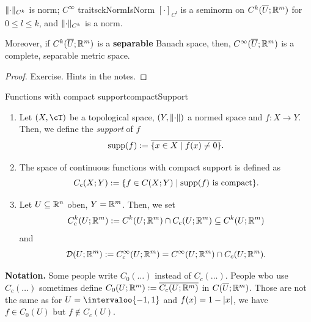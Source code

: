 \documentclass[language=english]{../../Template/TemplateLecture}
\begin{document}
\begin{thm}{$\lVert\cdot\rVert_{C^k}$ is norm; $C^\infty$ traits}{ckNormIsNorm}
    $[\cdot]_{C^l}$ is a seminorm on $C^k(\overline{U};\mathbb{R}^m)$ for $0 \leq l \leq k$, and $\lVert\cdot\rVert_{C^k}$ is a norm.

    Moreover, if $C^k(\overline{U};\mathbb{R}^m)$ is a \textbf{separable} Banach space, then, $C^\infty(\overline{U};\mathbb{R}^m)$ is a complete, separable metric space.
\end{thm}
\begin{proof}
    Exercise. Hints in the notes.
\end{proof}

\begin{defi}{Functions with compact support}{compactSupport}
    \begin{enumerate}[$(i)$]
        \item Let $(X,\cT)$ be a topological space, $(Y,\lVert\cdot\rVert)$ a normed space and $f: X \to Y$. Then, we define the \emph{support} of $f$
        \begin{equation}
            \operatorname{supp}(f) := \overline{\{x \in X \mid f(x) \neq 0\}}.
        \end{equation}
        \item The space of continuous functions with compact support is defined as 
        \begin{equation}
            C_c(X; Y) := \{f \in C(X; Y) \mid \operatorname{supp}(f) \text{ is compact}\}.
        \end{equation}
        \item Let $U \subseteq \mathbb{R}^n$ oben, $Y = \mathbb{R}^m$. Then, we set 
        \begin{equation}
            C_c^k(U; \mathbb{R}^m) := C^k(U; \mathbb{R}^m) \cap C_c(U; \mathbb{R}^m) \subseteq C^k(U; \mathbb{R}^m)
        \end{equation}
        and
        \begin{equation}
            \mathcal{D}(U; \mathbb{R}^m) := C_c^\infty(U; \mathbb{R}^m) = C^\infty(U; \mathbb{R}^m) \cap C_c(U; \mathbb{R}^m).
        \end{equation}
    \end{enumerate}
\end{defi}

\textbf{Notation.} Some people write $C_0(\ldots)$ instead of $C_c(\ldots)$. People wbo use $C_c(\ldots)$ sometimes define $C_0(U;\mathbb{R}^m) := \overline{C_c(U;\mathbb{R}^m)}$ in $C(\overline{U};\mathbb{R}^m)$. Those are not the same as for $U = \intervaloo{-1,1}$ and $f(x) = 1 - \lvert x\rvert$, we have $f \in C_0(U)$ but $f \notin C_c(U)$.
\end{document}
